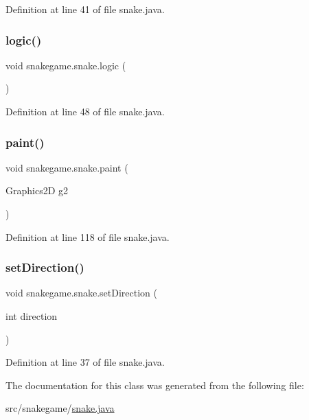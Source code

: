 Definition at line 41 of file snake.\+java.

\mbox{\label{classsnakegame_1_1snake_a9372b56db6a2e802f5bb7e7fc1b244d5}} 
\subsubsection{\texorpdfstring{logic()}{logic()}}
{\footnotesize\ttfamily void snakegame.\+snake.\+logic (\begin{DoxyParamCaption}{ }\end{DoxyParamCaption})}



Definition at line 48 of file snake.\+java.

\mbox{\label{classsnakegame_1_1snake_a0997b6e2c2b622c3f4b013868c0165b1}} 
\subsubsection{\texorpdfstring{paint()}{paint()}}
{\footnotesize\ttfamily void snakegame.\+snake.\+paint (\begin{DoxyParamCaption}\item[{Graphics2D}]{g2 }\end{DoxyParamCaption})}



Definition at line 118 of file snake.\+java.

\mbox{\label{classsnakegame_1_1snake_ad2d7f86bae0fc94adde6c4417b4e1b8a}} 
\subsubsection{\texorpdfstring{set\+Direction()}{setDirection()}}
{\footnotesize\ttfamily void snakegame.\+snake.\+set\+Direction (\begin{DoxyParamCaption}\item[{int}]{direction }\end{DoxyParamCaption})}



Definition at line 37 of file snake.\+java.



The documentation for this class was generated from the following file\+:\begin{DoxyCompactItemize}
\item 
src/snakegame/\mbox{\hyperlink{snake_8java}{snake.\+java}}\end{DoxyCompactItemize}
